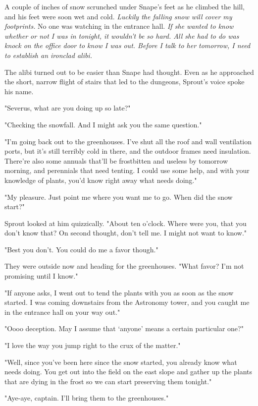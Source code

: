 A couple of inches of snow scrunched under Snape's feet as he climbed the hill, and his feet were soon wet and cold. \emph{Luckily the falling snow will cover my footprints.} No one was watching in the entrance hall. \emph{If she wanted to know whether or not I was in tonight, it wouldn't be so hard. All she had to do was knock on the office door to know I was out. Before I talk to her tomorrow, I need to establish an ironclad alibi.}

The alibi turned out to be easier than Snape had thought. Even as he approached the short, narrow flight of stairs that led to the dungeons, Sprout's voice spoke his name.

"Severus, what are you doing up so late?"

"Checking the snowfall. And I might ask you the same question."

"I'm going back out to the greenhouses. I've shut all the roof and wall ventilation ports, but it's still terribly cold in there, and the outdoor frames need insulation. There're also some annuals that'll be frostbitten and useless by tomorrow morning, and perennials that need tenting. I could use some help, and with your knowledge of plants, you'd know right away what needs doing."

"My pleasure. Just point me where you want me to go. When did the snow start?"

Sprout looked at him quizzically. "About ten o'clock. Where were you, that you don't know that? On second thought, don't tell me. I might not want to know."

"Best you don't. You could do me a favor though."

They were outside now and heading for the greenhouses. "What favor? I'm not promising until I know."

"If anyone asks, I went out to tend the plants with you as soon as the snow started. I was coming downstairs from the Astronomy tower, and you caught me in the entrance hall on your way out."

"Oooo{\el} deception. May I assume that `anyone' means a certain particular one?"

"I love the way you jump right to the crux of the matter."

"Well, since you've been here since the snow started, you already know what needs doing. You get out into the field on the east slope and gather up the plants that are dying in the frost so we can start preserving them tonight."

"Aye-aye, captain. I'll bring them to the greenhouses."


